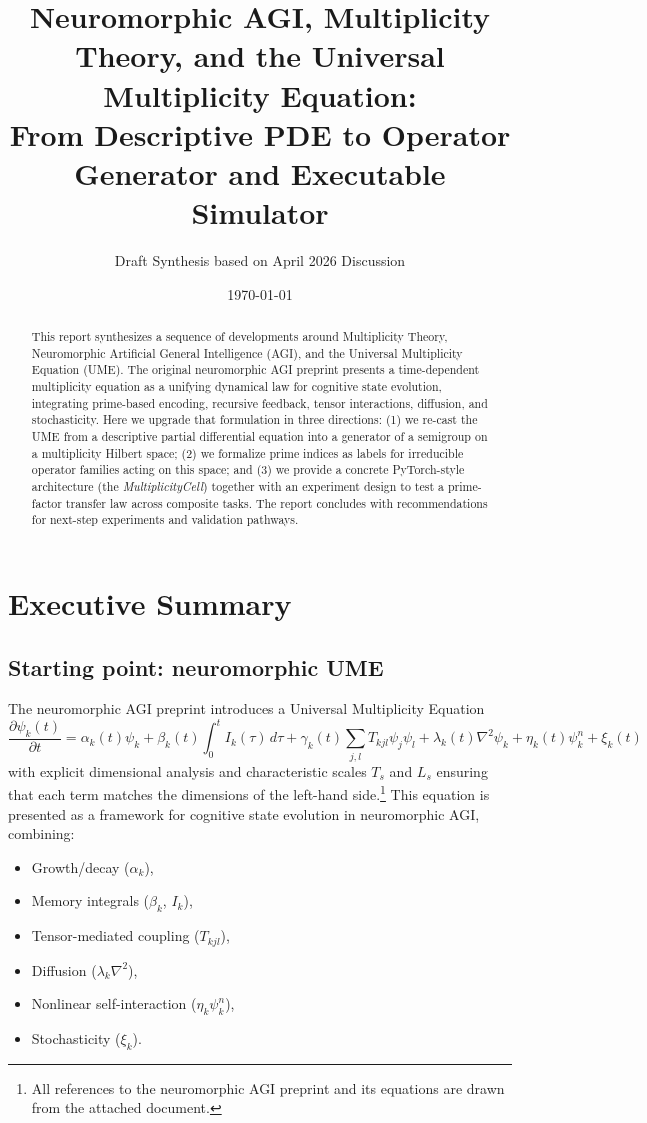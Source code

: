 \documentclass[11pt]{article}
\title{Neuromorphic AGI, Multiplicity Theory, and the Universal Multiplicity Equation:\\
From Descriptive PDE to Operator Generator and Executable Simulator}
\author{Draft Synthesis based on April 2026 Discussion}
\date{\today}
\begin{document}
\maketitle

\begin{abstract}
This report synthesizes a sequence of developments around Multiplicity Theory, Neuromorphic Artificial General Intelligence (AGI), and the Universal Multiplicity Equation (UME). The original neuromorphic AGI preprint presents a time-dependent multiplicity equation as a unifying dynamical law for cognitive state evolution, integrating prime-based encoding, recursive feedback, tensor interactions, diffusion, and stochasticity. Here we upgrade that formulation in three directions: (1) we re-cast the UME from a descriptive partial differential equation into a generator of a semigroup on a multiplicity Hilbert space; (2) we formalize prime indices as labels for irreducible operator families acting on this space; and (3) we provide a concrete PyTorch-style architecture (the \emph{MultiplicityCell}) together with an experiment design to test a prime-factor transfer law across composite tasks. The report concludes with recommendations for next-step experiments and validation pathways.
\end{abstract}

\newpage
\tableofcontents


\section{Executive Summary}

\subsection{Starting point: neuromorphic UME}

The neuromorphic AGI preprint introduces a Universal Multiplicity Equation
\begin{equation}
\frac{\partial \psi_k(t)}{\partial t}
= \alpha_k(t)\psi_k
+ \beta_k(t)\int_0^t I_k(\tau)\,d\tau
+ \gamma_k(t)\sum_{j,l} T_{kjl}\psi_j\psi_l
+ \lambda_k(t)\nabla^2\psi_k
+ \eta_k(t)\psi_k^n
+ \xi_k(t)
\label{eq:UME-coordinate}
\end{equation}
with explicit dimensional analysis and characteristic scales $T_s$ and $L_s$ ensuring that each term matches the dimensions of the left-hand side.\footnote{All references to the neuromorphic AGI preprint and its equations are drawn from the attached document.} This equation is presented as a framework for cognitive state evolution in neuromorphic AGI, combining:
\begin{itemize}[nosep]
\item Growth/decay ($\alpha_k$),
\item Memory integrals ($\beta_k$, $I_k$),
\item Tensor-mediated coupling ($T_{kjl}$),
\item Diffusion ($\lambda_k\nabla^2$),
\item Nonlinear self-interaction ($\eta_k\psi_k^n$),
\item Stochasticity ($\xi_k$).
\end{itemize}
\end{document}
